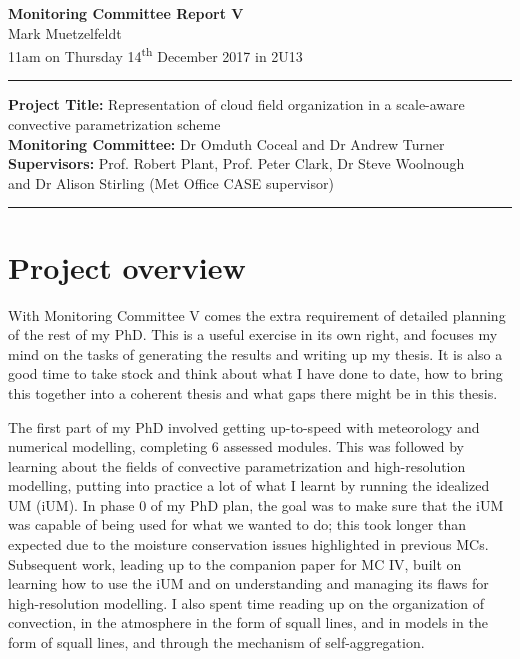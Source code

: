 \documentclass[11pt,a4paper]{article}
\newcommand{\ts}{\textsuperscript}
\begin{document}

\begin{center}
    \Large{\textbf{Monitoring Committee Report V}}\\[0.1cm]
    \large{Mark Muetzelfeldt}\\
    \normalsize{11am on Thursday 14\ts{th} December 2017 in 2U13}\\[0.1cm]		
    \rule{\textwidth}{0.2mm}
    \textbf{Project Title: }Representation of cloud field organization in a scale-aware convective parametrization scheme\\
    \textbf{Monitoring Committee: }Dr Omduth Coceal and  Dr Andrew Turner\\
    \textbf{Supervisors: }Prof. Robert Plant, Prof. Peter Clark, Dr Steve Woolnough \\
    and Dr Alison Stirling (Met Office CASE supervisor)\\
    \rule{\textwidth}{0.2mm}
\end{center}

\section{Project overview}
\label{sec:Project Overview}

With Monitoring Committee V comes the extra requirement of detailed planning of the rest of my PhD. This is a useful exercise in its own right, and focuses my mind on the tasks of generating the results and writing up my thesis. It is also a good time to take stock and think about what I have done to date, how to bring this together into a coherent thesis and what gaps there might be in this thesis.

The first part of my PhD involved getting up-to-speed with meteorology and numerical modelling, completing 6 assessed modules. This was followed by learning about the fields of convective parametrization and high-resolution modelling, putting into practice a lot of what I learnt by running the idealized UM (iUM). In phase 0 of my PhD plan, the goal was to make sure that the iUM was capable of being used for what we wanted to do; this took longer than expected due to the moisture conservation issues highlighted in previous MCs. Subsequent work, leading up to the companion paper for MC IV, built on learning how to use the iUM and on understanding and managing its flaws for high-resolution modelling. I also spent time reading up on the organization of convection, in the atmosphere in the form of squall lines, and in models in the form of squall lines, and through the mechanism of self-aggregation.
\end{document}
